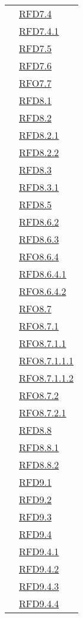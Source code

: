 \begin{longtable}{|>{\centering}m{5cm}|m{5cm}<{\centering}|}
& \hyperlink{RFD7.4}{RFD7.4}\\
& \hyperlink{RFD7.4.1}{RFD7.4.1}\\
& \hyperlink{RFD7.5}{RFD7.5}\\
& \hyperlink{RFD7.6}{RFD7.6}\\
& \hyperlink{RFO7.7}{RFO7.7}\\
& \hyperlink{RFD8.1}{RFD8.1}\\
& \hyperlink{RFD8.2}{RFD8.2}\\
& \hyperlink{RFD8.2.1}{RFD8.2.1}\\
& \hyperlink{RFD8.2.2}{RFD8.2.2}\\
& \hyperlink{RFD8.3}{RFD8.3}\\
& \hyperlink{RFD8.3.1}{RFD8.3.1}\\
& \hyperlink{RFD8.5}{RFD8.5}\\
& \hyperlink{RFD8.6.2}{RFD8.6.2}\\
& \hyperlink{RFD8.6.3}{RFD8.6.3}\\
& \hyperlink{RFO8.6.4}{RFO8.6.4}\\
& \hyperlink{RFD8.6.4.1}{RFD8.6.4.1}\\
& \hyperlink{RFO8.6.4.2}{RFO8.6.4.2}\\
& \hyperlink{RFO8.7}{RFO8.7}\\
& \hyperlink{RFO8.7.1}{RFO8.7.1}\\
& \hyperlink{RFO8.7.1.1}{RFO8.7.1.1}\\
& \hyperlink{RFO8.7.1.1.1}{RFO8.7.1.1.1}\\
& \hyperlink{RFO8.7.1.1.2}{RFO8.7.1.1.2}\\
& \hyperlink{RFO8.7.2}{RFO8.7.2}\\
& \hyperlink{RFO8.7.2.1}{RFO8.7.2.1}\\
& \hyperlink{RFD8.8}{RFD8.8}\\
& \hyperlink{RFD8.8.1}{RFD8.8.1}\\
& \hyperlink{RFD8.8.2}{RFD8.8.2}\\
& \hyperlink{RFD9.1}{RFD9.1}\\
& \hyperlink{RFD9.2}{RFD9.2}\\
& \hyperlink{RFD9.3}{RFD9.3}\\
& \hyperlink{RFD9.4}{RFD9.4}\\
& \hyperlink{RFD9.4.1}{RFD9.4.1}\\
& \hyperlink{RFD9.4.2}{RFD9.4.2}\\
& \hyperlink{RFD9.4.3}{RFD9.4.3}\\
& \hyperlink{RFD9.4.4}{RFD9.4.4}\\

\end{longtable}
